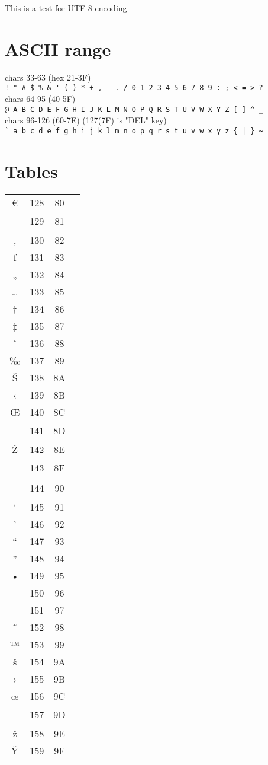\documentclass[10pt]{article}
\begin{document}
This is a test for UTF-8 encoding

\section{ASCII range}

chars 33-63 (hex 21-3F)\\
\verb|! " # $ % & ' ( ) * + , - . / 0 1 2 3 4 5 6 7 8 9 : ; < = > ?|\\

chars 64-95 (40-5F)\\
\verb|@ A B C D E F G H I J K L M N O P Q R S T U V W X Y Z [ ] ^ _|\\

chars 96-126 (60-7E) (127(7F) is "DEL" key)\\
\verb/` a b c d e f g h i j k l m n o p q r s t u v w x y z { | } ~/\\


\section{Tables}

\begin{tabular}{crcl}
€&128&80&\\
&129&81&\\
‚&130&82&\\
ƒ&131&83&\\
„&132&84&\\
…&133&85&\\
†&134&86&\\
‡&135&87&\\
ˆ&136&88&\\
‰&137&89&\\
Š&138&8A&\\
‹&139&8B&\\
Œ&140&8C&\\
&141&8D&\\
Ž&142&8E&\\
&143&8F&\\
&144&90&\\
‘&145&91&\\
’&146&92&\\
“&147&93&\\
”&148&94&\\
•&149&95&\\
–&150&96&\\
—&151&97&\\
˜&152&98&\\
™&153&99&\\
š&154&9A&\\
›&155&9B&\\
œ&156&9C&\\
&157&9D&\\
ž&158&9E&\\
Ÿ&159&9F&\\
\end{tabular}
\end{document}
